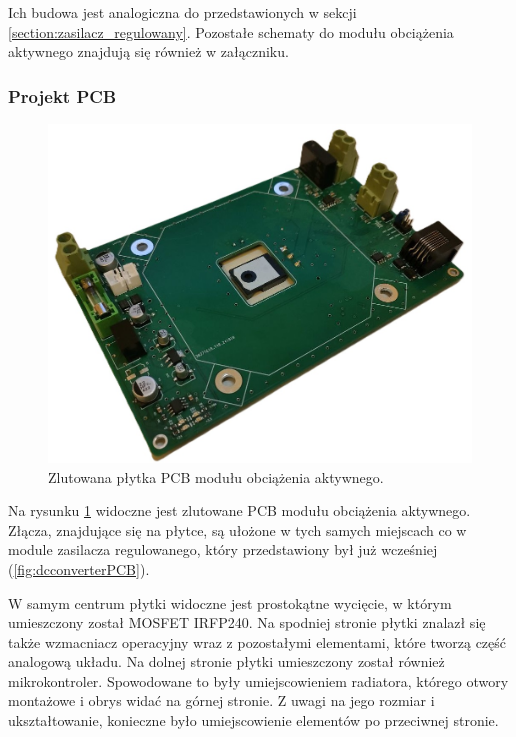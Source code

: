 Ich budowa jest analogiczna do przedstawionych w sekcji \ref{section:zasilacz_regulowany}.
Pozostałe schematy do modułu obciążenia aktywnego znajdują się również w załączniku.




\subsubsection{Projekt PCB}

\begin{figure}[h!]
    \begin{center}
        \includegraphics[width = 17cm]{images/dc_load_PCB.jpg}
        \caption{Zlutowana płytka PCB modułu obciążenia aktywnego.} 
        \label{fig:dcloadPCB}
    \end{center}
\end{figure}


Na rysunku \ref{fig:dcloadPCB} widoczne jest zlutowane PCB modułu obciążenia aktywnego. 
Złącza, znajdujące się na płytce, są ułożone w tych samych miejscach co w module zasilacza
regulowanego, który przedstawiony był już wcześniej (\ref{fig:dcconverterPCB}).

W samym centrum płytki widoczne jest prostokątne wycięcie, w którym umieszczony został MOSFET 
IRFP240. Na spodniej stronie płytki znalazł się także wzmacniacz operacyjny wraz z pozostałymi elementami,
które tworzą część analogową układu. Na dolnej stronie płytki umieszczony został również mikrokontroler.
Spowodowane to były umiejscowieniem radiatora, którego otwory montażowe i obrys widać na górnej stronie.
Z uwagi na jego rozmiar i ukształtowanie, konieczne było umiejscowienie elementów po przeciwnej stronie.

